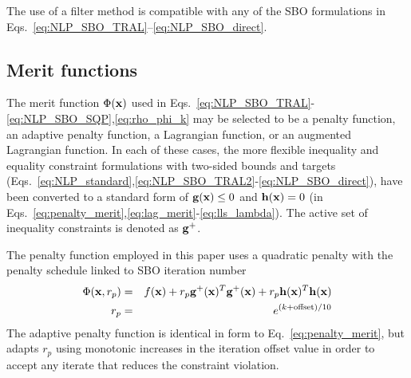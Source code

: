 The use of a filter method is compatible with any of the SBO
formulations in Eqs.~\ref{eq:NLP_SBO_TRAL}--\ref{eq:NLP_SBO_direct}.

\subsection{Merit functions} \label{sbm:sblm_con_merit}


The merit function $\Phi({\bf x})$ used in
Eqs.~\ref{eq:NLP_SBO_TRAL}-\ref{eq:NLP_SBO_SQP},\ref{eq:rho_phi_k} may be
selected to be a penalty function, an adaptive penalty function, a
Lagrangian function, or an augmented Lagrangian function.  In each of
these cases, the more flexible inequality and equality constraint
formulations with two-sided bounds and targets
(Eqs.~\ref{eq:NLP_standard},\ref{eq:NLP_SBO_TRAL2}-\ref{eq:NLP_SBO_direct}), 
have been converted to a standard form of ${\bf g}({\bf x}) \le 0$ and
${\bf h}({\bf x}) = 0$ (in
Eqs.~\ref{eq:penalty_merit},\ref{eq:lag_merit}-\ref{eq:lls_lambda}).
The active set of inequality constraints is denoted as ${\bf g}^+$.

The penalty function employed in this paper uses a quadratic penalty
with the penalty schedule linked to SBO iteration number
\begin{eqnarray}
\Phi({\bf x}, r_p) & = & f({\bf x})
+ r_p {\bf g}^+({\bf x})^T {\bf g}^+({\bf x})
+ r_p {\bf h}({\bf x})^T {\bf h}({\bf x}) \label{eq:penalty_merit} \\
r_p & = & e^{(k + {\rm offset})/10} %
\label{eq:exp_rp}
\end{eqnarray}
The adaptive penalty function is identical in form to
Eq.~\ref{eq:penalty_merit}, but adapts $r_p$ using monotonic increases
in the iteration offset value in order to accept any iterate that
reduces the constraint violation.

